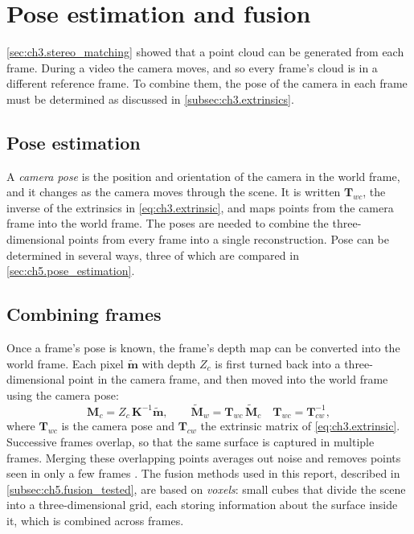 \section{Pose estimation and fusion}
\label{sec:ch3.pose}

\autoref{sec:ch3.stereo_matching} showed that a point cloud can be generated from each
frame. During a video the camera moves, and so every frame's
 cloud is in a different reference frame. 
 To combine them, the pose of the camera in each frame must be determined as discussed in \autoref{subsec:ch3.extrinsics}.

\subsection{Pose estimation}
\label{subsec:ch3.pose}
A \textit{camera pose} is the position and orientation of the camera in the world frame, and it changes as the camera moves
through the scene. It is written $\mathbf{T}_{wc}$, the inverse of the extrinsics in \autoref{eq:ch3.extrinsic}, and maps points from the camera frame into the world frame. The poses are needed to combine the three-dimensional points from every frame into a single reconstruction.
Pose can be determined in several ways, three of which are compared in \autoref{sec:ch5.pose_estimation}.


\subsection{Combining frames}
\label{subsec:ch3.fusion}
Once a frame's pose is known, the frame's depth map can be
 converted into the world frame. 
Each pixel $\tilde{\mathbf{m}}$ with depth $Z_c$ is first turned back into a three-dimensional point in the camera frame, and then moved into the world frame using the camera pose:
\begin{equation}
	\mathbf{M}_c = Z_c\,\mathbf{K}^{-1}\tilde{\mathbf{m}},
	\qquad
	\tilde{\mathbf{M}}_w = \mathbf{T}_{wc}\,\tilde{\mathbf{M}}_c
	\quad \mathbf{T}_{wc} = \mathbf{T}_{cw}^{-1} ,
	\label{eq:ch3.backproject}
\end{equation}
where $\mathbf{T}_{wc}$ is the camera pose and $\mathbf{T}_{cw}$ the extrinsic matrix of \autoref{eq:ch3.extrinsic}.
Successive frames overlap, so that the same surface is captured in
multiple frames. Merging these overlapping points averages out noise and
removes points seen in only a few frames \cite{curlessVolumetricMethodBuilding1996}.
The fusion methods used in this report, described in \autoref{subsec:ch5.fusion_tested}, are based on \textit{voxels}:
  small cubes that divide the scene into a three-dimensional grid, each storing
  information about the surface inside it, which is combined across frames.

